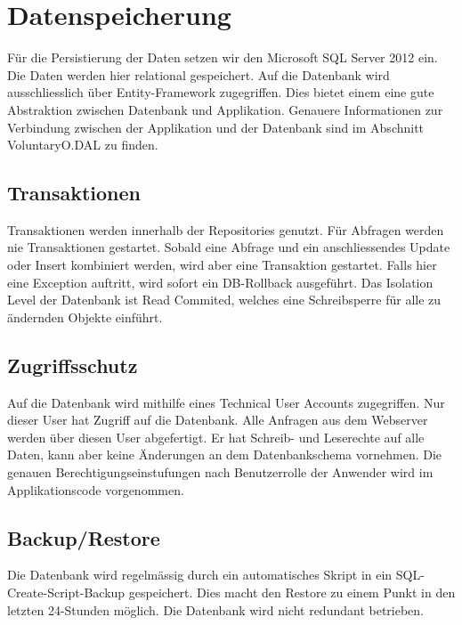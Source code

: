 \chapter{Datenspeicherung}
	Für die Persistierung der Daten setzen wir den Microsoft SQL Server 2012 ein. Die Daten werden hier relational gespeichert.
	Auf die Datenbank wird ausschliesslich über Entity-Framework zugegriffen. Dies bietet einem eine gute Abstraktion zwischen Datenbank und Applikation.
	Genauere Informationen zur Verbindung zwischen der Applikation und der Datenbank sind im Abschnitt VoluntaryO.DAL zu finden.
	\section{Transaktionen}
	Transaktionen werden innerhalb der Repositories genutzt. Für Abfragen werden nie Transaktionen gestartet. Sobald eine Abfrage und ein anschliessendes Update oder Insert kombiniert werden, wird aber eine Transaktion gestartet. Falls hier eine Exception auftritt, wird sofort ein DB-Rollback ausgeführt.
	Das Isolation Level der Datenbank ist Read Commited, welches eine Schreibsperre für alle zu ändernden Objekte einführt.
	\section{Zugriffsschutz}
	Auf die Datenbank wird mithilfe eines Technical User Accounts zugegriffen. Nur dieser User hat Zugriff auf die Datenbank. Alle Anfragen aus dem Webserver werden über diesen User abgefertigt. Er hat Schreib- und Leserechte auf alle Daten, kann aber keine Änderungen an dem Datenbankschema vornehmen.
	Die genauen Berechtigungseinstufungen nach Benutzerrolle der Anwender wird im Applikationscode vorgenommen.
	\section{Backup/Restore}
	Die Datenbank wird regelmässig durch ein automatisches Skript in ein SQL-Create-Script-Backup gespeichert. Dies macht den Restore zu einem Punkt in den letzten 24-Stunden möglich.
	Die Datenbank wird nicht redundant betrieben.
